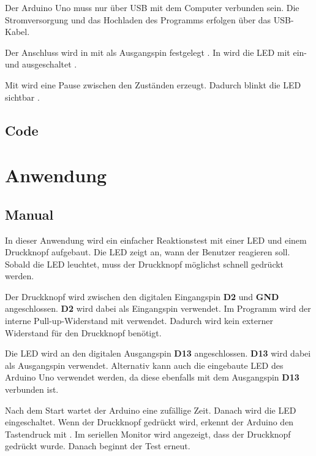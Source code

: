 Der Arduino Uno muss nur über USB mit dem Computer verbunden sein. Die Stromversorgung und das Hochladen des Programms erfolgen über das USB-Kabel.

Der Anschluss wird in  mit  als Ausgangspin festgelegt \cite{arduino_pinmode}. In  wird die LED mit  ein- und ausgeschaltet \cite{arduino_digitalwrite}.

Mit  wird eine Pause zwischen den Zuständen erzeugt. Dadurch blinkt die LED sichtbar \cite{arduino:language-reference}.

\subsection{Code}

{
	\label{lst:BlinkInternalLED}
}

\section{Anwendung}

\subsection{Manual}

In dieser Anwendung wird ein einfacher Reaktionstest mit einer LED und einem Druckknopf aufgebaut. Die LED zeigt an, wann der Benutzer reagieren soll. Sobald die LED leuchtet, muss der Druckknopf möglichst schnell gedrückt werden.

Der Druckknopf wird zwischen den digitalen Eingangspin \textbf{D2} und \textbf{GND} angeschlossen. \textbf{D2} wird dabei als Eingangspin verwendet. Im Programm wird der interne Pull-up-Widerstand mit  verwendet. Dadurch wird kein externer Widerstand für den Druckknopf benötigt.

Die LED wird an den digitalen Ausgangspin \textbf{D13} angeschlossen. \textbf{D13} wird dabei als Ausgangspin verwendet. Alternativ kann auch die eingebaute LED des Arduino Uno verwendet werden, da diese ebenfalls mit dem Ausgangspin \textbf{D13} verbunden ist.

Nach dem Start wartet der Arduino eine zufällige Zeit. Danach wird die LED eingeschaltet. Wenn der Druckknopf gedrückt wird, erkennt der Arduino den Tastendruck mit . Im seriellen Monitor wird angezeigt, dass der Druckknopf gedrückt wurde. Danach beginnt der Test erneut.

